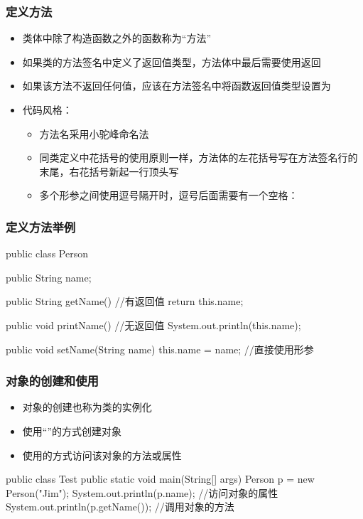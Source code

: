 \begin{frame}
  \frametitle{定义方法}
  \begin{itemize}
    \item 类体中除了构造函数之外的函数称为“方法”
    \item 如果类的方法签名中定义了返回值类型，方法体中最后需要使用返回
    \item 如果该方法不返回任何值，应该在方法签名中将函数返回值类型设置为
    \item 代码风格：
      \begin{itemize}
        \item 方法名采用小驼峰命名法
        \item 同类定义中花括号的使用原则一样，方法体的左花括号写在方法签名行的末尾，右花括号新起一行顶头写
        \item 多个形参之间使用逗号隔开时，逗号后面需要有一个空格：
      \end{itemize}
  \end{itemize}
\end{frame}

\begin{frame}[fragile]
  \frametitle{定义方法举例}
  \begin{javacode}
    public class Person {
      public String name;
      
      public String getName() { //有返回值
        return this.name;
      }
      
      public void printName() { //无返回值
        System.out.println(this.name);
      }
      
      public void setName(String name) {
        this.name = name; //直接使用形参
      }
    }  
  \end{javacode}
\end{frame}

\begin{frame}[fragile]
  \frametitle{对象的创建和使用}
  \begin{itemize}
    \item 对象的创建也称为类的实例化
    \item 使用“”的方式创建对象
    \item 使用的方式访问该对象的方法或属性
  \end{itemize}
  \begin{javacode}
    public class Test {
      public static void main(String[] args) {
        Person p = new Person("Jim");
        System.out.println(p.name); //访问对象的属性
        System.out.println(p.getName()); //调用对象的方法
      }
    }
  \end{javacode}

\end{frame}


